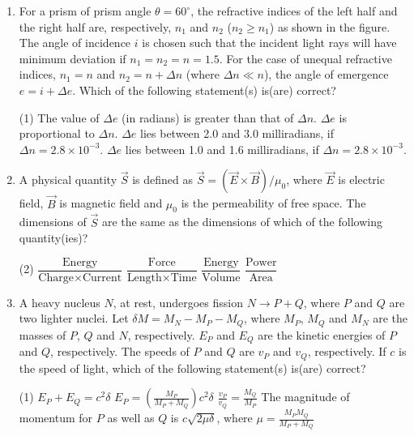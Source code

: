 \documentclass{article}
\begin{document}
\begin{enumerate}
    \item For a prism of prism angle $\theta = 60^{\circ}$, the refractive indices of the left half and the right half are, respectively, $n_1$ and $n_2$ ($n_2 \geq n_1$) as shown in the figure. The angle of incidence $i$ is chosen such that the incident light rays will have minimum deviation if $n_1 = n_2 = n = 1.5$. For the case of unequal refractive indices, $n_1 = n$ and $n_2 = n + \Delta n$ (where $\Delta n \ll n$), the angle of emergence $e = i + \Delta e$. Which of the following statement(s) is(are) correct?
        \begin{center}
        \end{center}
        \begin{tasks}(1)
            \task The value of $\Delta e$ (in radians) is greater than that of $\Delta n$.
            \task $\Delta e$ is proportional to $\Delta n$.
            \task $\Delta e$ lies between 2.0 and 3.0 milliradians, if $\Delta n = 2.8 \times 10^{-3}$.
            \task $\Delta e$ lies between 1.0 and 1.6 milliradians, if $\Delta n = 2.8 \times 10^{-3}$.
        \end{tasks}
    \item A physical quantity $\vec{S}$ is defined as $\vec{S} = (\vec{E} \times \vec{B})/\mu_0$, where $\vec{E}$ is electric field, $\vec{B}$ is magnetic field and $\mu_0$ is the permeability of free space. The dimensions of $\vec{S}$ are the same as the dimensions of which of the following quantity(ies)?
        \begin{tasks}(2)
            \task $\dfrac{\text{Energy}}{\text{Charge} \times \text{Current}}$
            \task $\dfrac{\text{Force}}{\text{Length} \times \text{Time}}$
            \task $\dfrac{\text{Energy}}{\text{Volume}}$
            \task $\dfrac{\text{Power}}{\text{Area}}$
        \end{tasks}
    \item A heavy nucleus $N$, at rest, undergoes fission $N \rightarrow P + Q$, where $P$ and $Q$ are two lighter nuclei. Let $\delta M = M_N - M_P - M_Q$, where $M_P$, $M_Q$ and $M_N$ are the masses of $P$, $Q$ and $N$, respectively. $E_P$ and $E_Q$ are the kinetic energies of $P$ and $Q$, respectively. The speeds of $P$ and $Q$ are $v_P$ and $v_Q$, respectively. If $c$ is the speed of light, which of the following statement(s) is(are) correct?
    \begin{tasks}(1)
        \task $E_P + E_Q = c^2 \delta$
        \task $E_P = \left( \frac{M_P}{M_P+M_Q} \right) c^2 \delta$
        \task $\frac{v_P}{v_Q} = \frac{M_Q}{M_P}$
        \task The magnitude of momentum for $P$ as well as $Q$ is $c \sqrt{2\mu \delta}$, where $\mu = \frac{M_P M_Q}{M_P+M_Q}$
    \end{tasks}


\end{enumerate}
\end{document}

